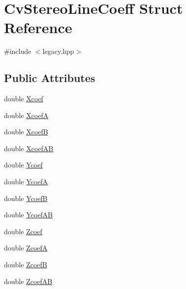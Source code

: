\hypertarget{structCvStereoLineCoeff}{\section{Cv\-Stereo\-Line\-Coeff Struct Reference}
\label{structCvStereoLineCoeff}
}


{\ttfamily \#include $<$legacy.\-hpp$>$}

\subsection*{Public Attributes}
\begin{DoxyCompactItemize}
\item 
double \hyperlink{structCvStereoLineCoeff_a37f582afe1a799d6d16255266a1223d0}{Xcoef}
\item 
double \hyperlink{structCvStereoLineCoeff_a2d619f8621ef86e0f47bc5c67ca988dc}{Xcoef\-A}
\item 
double \hyperlink{structCvStereoLineCoeff_a28fb7984cb8569db65134dbe8117fe67}{Xcoef\-B}
\item 
double \hyperlink{structCvStereoLineCoeff_a4742e83052ad5a814af2a05e95ae04fd}{Xcoef\-A\-B}
\item 
double \hyperlink{structCvStereoLineCoeff_a2f2134644686c45dca373c5d88045033}{Ycoef}
\item 
double \hyperlink{structCvStereoLineCoeff_a6b67530fcb041c7213001056259dddff}{Ycoef\-A}
\item 
double \hyperlink{structCvStereoLineCoeff_a2c94956bca5a818af781b90d8dc841ec}{Ycoef\-B}
\item 
double \hyperlink{structCvStereoLineCoeff_a34b35e9afff402fb69459416e565aeac}{Ycoef\-A\-B}
\item 
double \hyperlink{structCvStereoLineCoeff_acf1797731e5d553e6ea09f6a52d372d0}{Zcoef}
\item 
double \hyperlink{structCvStereoLineCoeff_afcaee17d41a5bdcc469db810a8c734d6}{Zcoef\-A}
\item 
double \hyperlink{structCvStereoLineCoeff_a700fbf82f7a601a1518d58f14d7d0819}{Zcoef\-B}
\item 
double \hyperlink{structCvStereoLineCoeff_a61e95e05fc766d5e629014cfff1aa6ab}{Zcoef\-A\-B}
\end{DoxyCompactItemize}



